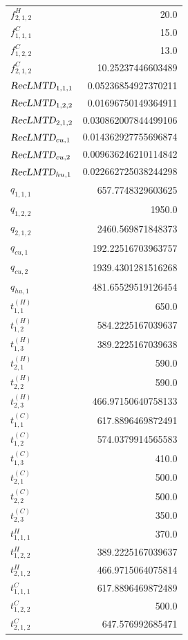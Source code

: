 \documentclass{article}%
\begin{document}
\begin{multicols*}{3}
\begin{supertabular}{lr}
	$f_{2,1,2}^{H}$ & 20.0 \\%
	$f_{1,1,1}^{C}$ & 15.0 \\%
	$f_{1,2,2}^{C}$ & 13.0 \\%
	$f_{2,1,2}^{C}$ & 10.25237446603489 \\%
	$\textsl{RecLMTD}_{1,1,1}$ & 0.05236854927370211 \\%
	$\textsl{RecLMTD}_{1,2,2}$ & 0.01696750149364911 \\%
	$\textsl{RecLMTD}_{2,1,2}$ & 0.030862007844499106 \\%
	$\textsl{RecLMTD}_{cu,1}$ & 0.014362927755696874 \\%
	$\textsl{RecLMTD}_{cu,2}$ & 0.009636246210114842 \\%
	$\textsl{RecLMTD}_{hu,1}$ & 0.022662725038244298 \\%
	$q_{1,1,1}$ & 657.7748329603625 \\%
	$q_{1,2,2}$ & 1950.0 \\%
	$q_{2,1,2}$ & 2460.569871848373 \\%
	$q_{cu,1}$ & 192.22516703963757 \\%
	$q_{cu,2}$ & 1939.4301281516268 \\%
	$q_{hu,1}$ & 481.65529519126454 \\%
	$t_{1,1}^{(H)}$ & 650.0 \\%
	$t_{1,2}^{(H)}$ & 584.2225167039637 \\%
	$t_{1,3}^{(H)}$ & 389.2225167039638 \\%
	$t_{2,1}^{(H)}$ & 590.0 \\%
	$t_{2,2}^{(H)}$ & 590.0 \\%
	$t_{2,3}^{(H)}$ & 466.97150640758133 \\%
	$t_{1,1}^{(C)}$ & 617.8896469872491 \\%
	$t_{1,2}^{(C)}$ & 574.0379914565583 \\%
	$t_{1,3}^{(C)}$ & 410.0 \\%
	$t_{2,1}^{(C)}$ & 500.0 \\%
	$t_{2,2}^{(C)}$ & 500.0 \\%
	$t_{2,3}^{(C)}$ & 350.0 \\%
	$t_{1,1,1}^{H}$ & 370.0 \\%
	$t_{1,2,2}^{H}$ & 389.2225167039637 \\%
	$t_{2,1,2}^{H}$ & 466.9715064075814 \\%
	$t_{1,1,1}^{C}$ & 617.8896469872489 \\%
	$t_{1,2,2}^{C}$ & 500.0 \\%
	$t_{2,1,2}^{C}$ & 647.576992685471 \\%

\end{supertabular}
\end{multicols*}
\end{document}

